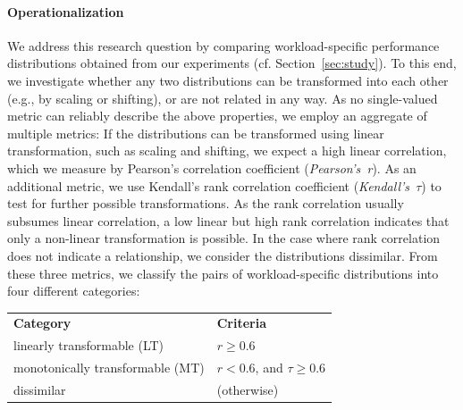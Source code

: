 
\paragraph*{Operationalization}
We address this research question by comparing workload-specific performance distributions obtained from our experiments (cf. Section~\ref{sec:study}). To this end, we investigate whether any two distributions can be transformed into each other (e.g., by scaling or shifting), or are not related in any way. As no single-valued metric can reliably describe the above properties, we employ an aggregate of multiple metrics: 
If the distributions can be transformed using linear transformation, such as scaling and shifting, we expect a high linear correlation, which we measure by Pearson’s correlation coefficient (\emph{Pearson's~r}). As an additional metric, we use Kendall’s rank correlation coefficient (\emph{Kendall's~$\tau$}) to test for further possible transformations. As the rank correlation usually subsumes linear correlation, a low linear but high rank correlation indicates that only a non-linear transformation is possible. In the case where rank correlation does not indicate a relationship, we consider the distributions dissimilar. From these three metrics, we classify the pairs of workload-specific distributions into four different categories:
\vspace{1mm}

\begin{tabular}{p{4.4cm}l}
	 \textbf{Category} & \textbf{Criteria} \\
	{linearly transformable (LT)} & $r \geq 0.6$ \\
	{monotonically transformable (MT)} & $r < 0.6$, and $\tau \geq 0.6$ \\
	{dissimilar}  & (otherwise) \\%
\end{tabular}

